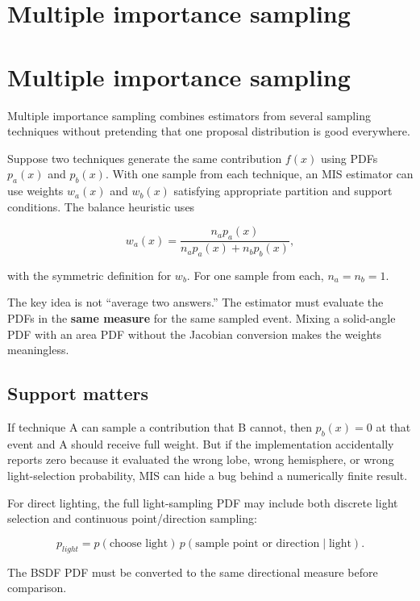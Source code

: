 \hypertarget{appendix-ca8898faf1a6}{}
\section*{Multiple importance sampling}
\section{Multiple importance sampling}\label{appendix-ca8898faf1a6-multiple-importance-sampling}

Multiple importance sampling combines estimators from several sampling techniques without pretending that one proposal distribution is good everywhere.

Suppose two techniques generate the same contribution \(f(x)\) using PDFs \(p_a(x)\) and \(p_b(x)\). With one sample from each technique, an MIS estimator can use weights \(w_a(x)\) and \(w_b(x)\) satisfying appropriate partition and support conditions. The balance heuristic uses

\[
w_a(x)=\frac{n_a p_a(x)}{n_a p_a(x)+n_b p_b(x)},
\]

with the symmetric definition for \(w_b\). For one sample from each, \(n_a=n_b=1\).

The key idea is not ``average two answers.'' The estimator must evaluate the PDFs in the \textbf{same measure} for the same sampled event. Mixing a solid-angle PDF with an area PDF without the Jacobian conversion makes the weights meaningless.

\subsection{Support matters}\label{appendix-ca8898faf1a6-support-matters}

If technique A can sample a contribution that B cannot, then \(p_b(x)=0\) at that event and A should receive full weight. But if the implementation accidentally reports zero because it evaluated the wrong lobe, wrong hemisphere, or wrong light-selection probability, MIS can hide a bug behind a numerically finite result.

For direct lighting, the full light-sampling PDF may include both discrete light selection and continuous point/direction sampling:

\[
p_{light}=p(\text{choose light})\,p(\text{sample point or direction}\mid\text{light}).
\]

The BSDF PDF must be converted to the same directional measure before comparison.

